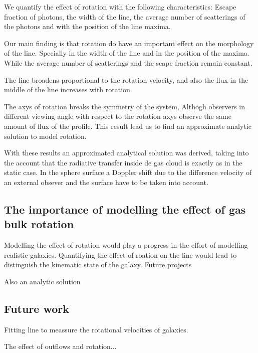 We quantify the effect of rotation with the following characteristics: 
Escape fraction of \ly photons, the width of the \ly line, the average number
of scatterings of the \ly photons and with the position of the \ly line maxima.

Our main finding is that rotation do have an important effect on the morphology 
of the \ly line. Specially in the width of the line and in the position of the 
maxima. While the average number of scatterings  and the scape
fraction remain constant.

The line broadens proportional to the rotation velocity, and also the flux in 
the middle of the line increases with rotation.

The axys of rotation breaks the symmetry of the system, Althogh 
observers in different viewing angle with respect to the rotation axys
observe the same amount of flux of the \ly profile. This result
lead us to find an approximate analytic solution to model rotation.
 
 
With these results an approximated analytical solution was derived, 
taking into the account that the radiative transfer inside de gas
cloud is exactly as in the static case. In the sphere surface
a Doppler shift due to the difference velocity of an external 
obsever and the surface have to be taken into account.  


\subsection{The importance of modelling the effect of gas bulk rotation}

Modelling the effect of rotation would play a progress in the effort
of modelling realistic galaxies. Quantifying the effect of roation 
on the \ly line would lead to distinguish the kinematic state
of the galaxy. Future projects  

Also an analytic solution 

\subsection{Future work}

Fitting \ly line to meassure the rotational velocities of galaxies.

The effect of outflows and rotation...
